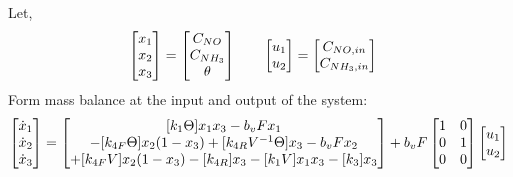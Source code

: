 Let,
\begin{align*}
    \begin{bmatrix} x_1 \\ x_2 \\ x_3 \end{bmatrix} = \begin{bmatrix} C_{NO} \\ C_{NH_3} \\ \theta \end{bmatrix} \qquad &
    \begin{bmatrix} u_1 \\ u_2  \end{bmatrix} = \begin{bmatrix} C_{NO, in} \\ C_{NH_3, in} \end{bmatrix}
\end{align*}
Form mass balance at the input and output of the system:
\begin{equation}\label{eqn::3_state_theta}
    \begin{bmatrix} \dot x_1 \\ \dot x_2 \\ \dot x_3 \end{bmatrix} =
    \begin{bmatrix} [k_1 \Theta] x_1 x_3 - b_v F x_1 \\
        -[k_{4F} \Theta] x_2 (1-x_3) + [k_{4R} V^{-1} \Theta] x_3 - b_v F x_2 \\
        +[k_{4F}V] x_2 (1-x_3) - [k_{4R}] x_3 - [k_1 V] x_1 x_3 - [k_3 ] x_3 \end{bmatrix} +
    b_v F \begin{bmatrix} 1 & 0 \\ 0 & 1 \\ 0 & 0 \end{bmatrix} \begin{bmatrix} u_1 \\ u_2 \end{bmatrix}\\
\end{equation}

